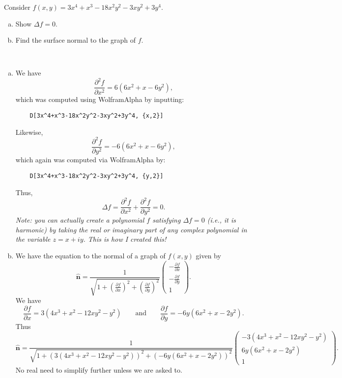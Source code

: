 \documentclass[12pt]{article} %
\newcommand{\unitvec}{\boldsymbol{\hat{n}}}
\begin{document}
\newpage
\begin{problem}
Consider $f(x,y)= 3x^4+x^3-18x^2y^2-3xy^2+3y^4$. 
\begin{enumerate}[(a)]
    \item Show $\Delta f = 0$.
    \item Find the surface normal to the graph of $f$.
\end{enumerate}
\end{problem}
\begin{solution}~
\begin{enumerate}[(a)]
    \item We have
    \[
    \frac{\partial^2 f}{\partial x^2} = 6(6x^2+x-6y^2),
    \]
    which was computed using WolframAlpha by inputting:
    \begin{verbatim}
    D[3x^4+x^3-18x^2y^2-3xy^2+3y^4, {x,2}]
    \end{verbatim}
    Likewise,
    \[
    \frac{\partial^2 f}{\partial y^2} = -6(6x^2+x-6y^2),
    \]
    which again was computed via WolframAlpha by:
    \begin{verbatim}
    D[3x^4+x^3-18x^2y^2-3xy^2+3y^4, {y,2}]
    \end{verbatim}
    Thus,
    \[
    \Delta f = \frac{\partial^2 f}{\partial x^2} + \frac{\partial^2 f}{\partial y^2} = 0.
    \]
    \emph{Note: you can actually create a polynomial $f$ satisfying $\Delta f = 0$ (i.e., it is harmonic) by taking the real or imaginary part of any complex polynomial in the variable $z=x+iy$. This is how I created this!}

    \item We have the equation to the normal of a graph of $f(x,y)$ given by
    \[
        \unitvec = \frac{1}{\sqrt{1+\left(\frac{\partial f}{\partial x}\right)^2 + \left(\frac{\partial f}{\partial y}\right)^2}} \begin{pmatrix} -\frac{\partial f}{\partial x} \\ -\frac{\partial f}{\partial y} \\ 1 \end{pmatrix}.
    \]
    We have
    \[
    \frac{\partial f}{\partial x} = 3(4x^3+x^2-12xy^2-y^2) \qquad \textrm{and} \qquad \frac{\partial f}{\partial y} = -6y(6x^2+x-2y^2).
    \]
    Thus
    \[
    \boxed{\unitvec = \frac{1}{\sqrt{1 + \left( 3(4x^3+x^2-12xy^2-y^2) \right)^2 + \left( -6y(6x^2+x-2y^2) \right)^2 }} \begin{pmatrix} -3(4x^3+x^2-12xy^2-y^2) \\ 6y(6x^2+x-2y^2) \\ 1 \end{pmatrix}.}
    \]
    No real need to simplify further unless we are asked to.
\end{enumerate}
\end{solution}
\end{document}
